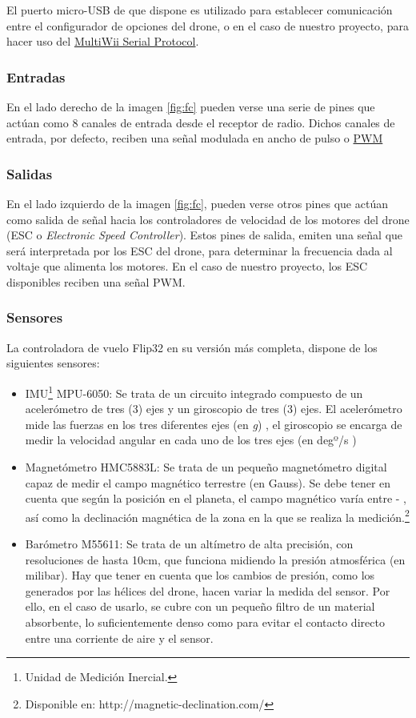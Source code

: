 El puerto micro-USB de que dispone es utilizado para establecer comunicación entre el configurador de opciones del drone, o en el caso de nuestro proyecto, para hacer uso del \hyperref[subsec:MSP]{MultiWii Serial Protocol}. 


\subsubsection{Entradas}
En el lado derecho de la imagen \ref{fig:fc} pueden verse una serie de pines que actúan como 8 canales de entrada desde el receptor de radio.
Dichos canales de entrada, por defecto, reciben una señal modulada en ancho de pulso o \hyperref[subsec:PWM]{PWM}

 

\subsubsection{Salidas}
En el lado izquierdo de la imagen \ref{fig:fc}, pueden verse otros pines que actúan como salida de señal hacia los controladores de velocidad de los motores del drone (ESC o \textit{Electronic Speed Controller}).
Estos pines de salida, emiten una señal que será interpretada por los ESC del drone, para determinar la frecuencia dada al voltaje que alimenta los motores. En el caso de nuestro proyecto, los ESC disponibles reciben una señal PWM.

\newpage
\subsubsection{Sensores}
\label{subsubsec:sensors}
La controladora de vuelo Flip32 en su versión más completa, dispone de los siguientes sensores:
\begin{itemize}
\item IMU\footnote{Unidad de Medición Inercial.} MPU-6050: Se trata de un circuito integrado compuesto de un acelerómetro de tres (3) ejes y un giroscopio de tres (3) ejes. El acelerómetro mide las fuerzas en los tres diferentes ejes (en \textit{g}) , el giroscopio se encarga de medir la velocidad angular en cada uno de los tres ejes (en degº/s )
\item Magnetómetro HMC5883L: Se trata de un pequeño magnetómetro digital capaz de medir el campo magnético terrestre (en Gauss). Se debe tener en cuenta que según la posición en el planeta, el campo magnético varía entre \si{} - \si{}, así como la declinación magnética de la zona en la que se realiza la medición.\footnote{Disponible en: http://magnetic-declination.com/}
\item Barómetro M55611: Se trata de un altímetro de alta precisión, con resoluciones de hasta 10cm, que funciona midiendo la presión atmosférica (en milibar). Hay que tener en cuenta que los cambios de presión, como los generados por las hélices del drone, hacen variar la medida del sensor. Por ello, en el caso de usarlo, se cubre con un pequeño filtro de un material absorbente, lo suficientemente denso como para evitar el contacto directo entre una corriente de aire y el sensor.
\end{itemize}

